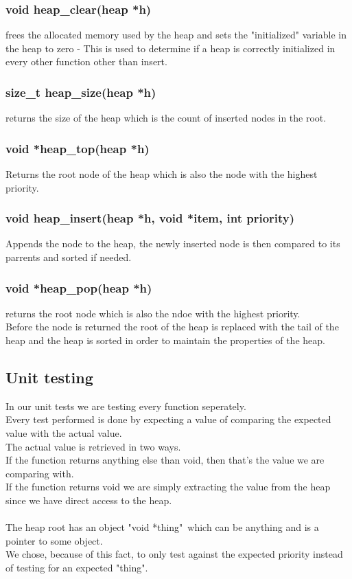 \documentclass[a4paper,12pt,danish]{report}
\begin{document}
\subsubsection{void heap\_clear(heap *h)}
frees the allocated memory used by the heap and sets the "initialized" variable in the heap to zero - This is used to determine if a heap is correctly initialized in every other function other than insert.

\subsubsection{size\_t heap\_size(heap *h)}
returns the size of the heap which is the count of inserted nodes in the root.

\subsubsection{void *heap\_top(heap *h)}
Returns the root node of the heap which is also the node with the highest priority.

\subsubsection{void heap\_insert(heap *h, void *item, int priority)}
Appends the node to the heap, the newly inserted node is then compared to its parrents and sorted if needed.

\subsubsection{void *heap\_pop(heap *h)}
returns the root node which is also the ndoe with the highest priority.
\\
Before the node is returned the root of the heap is replaced with the tail of the heap and the heap is sorted in order to maintain the properties of the heap.
\subsection{Unit testing}
In our unit tests we are testing every function seperately.
\\
Every test performed is done by expecting a value of comparing the expected value with the actual value.
\\
The actual value is retrieved in two ways.
\\
If the function returns anything else than void, then that's the value we are comparing with.
\\
If the function returns void we are simply extracting the value from the heap since we have direct access to the heap.
\\
\\
The heap root has an object "void *thing"\ which can be anything and is a pointer to some object.
\\
We chose, because of this fact, to only test against the expected priority instead of testing for an expected "thing".
\\
\end{document}
